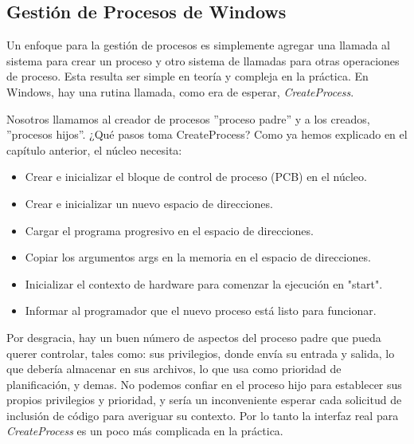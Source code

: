 \documentclass[10pt]{book}
\begin{document}
\subsection{Gestión de Procesos de Windows}
Un enfoque para la gestión de procesos es simplemente agregar una llamada al sistema para crear un proceso y otro sistema de llamadas para otras operaciones de proceso. Esta resulta ser simple en teoría y compleja en la práctica. En Windows, hay una rutina llamada, como era de esperar, \textit{CreateProcess}.

Nosotros llamamos al creador de procesos ''proceso padre'' y a los creados, ''procesos hijos''. ¿Qué pasos toma CreateProcess? Como ya hemos explicado en el capítulo anterior, el núcleo necesita:

\begin{itemize}
\item Crear e inicializar el bloque de control de proceso (PCB) en el núcleo.
\item Crear e inicializar un nuevo espacio de direcciones.
\item Cargar el programa progresivo en el espacio de direcciones.
\item Copiar los argumentos args en la memoria en el espacio de direcciones.
\item Inicializar el contexto de hardware para comenzar la ejecución en "start".
\item Informar al programador que el nuevo proceso está listo para funcionar.
\end{itemize}

Por desgracia, hay un buen número de aspectos del proceso padre que pueda querer controlar, tales como: sus privilegios, donde envía su entrada y salida, lo que debería almacenar en sus archivos, lo que usa como prioridad de planificación, y demas. No podemos confiar en el proceso hijo para establecer sus propios privilegios y prioridad, y sería un inconveniente esperar cada solicitud de inclusión de código para averiguar su contexto. Por lo tanto la interfaz real para \textit{CreateProcess} es un poco más complicada en la práctica.
\end{document}
